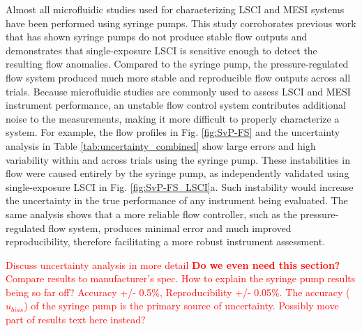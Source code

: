 \documentclass[12pt]{spieman}
\begin{document}
\begin{spacing}{2}
Almost all microfluidic studies used for characterizing LSCI and MESI systems have been performed using syringe pumps. This study corroborates previous work \cite{Korczyk:2010eu,Li:2014ca,Zhou:2011ey} that has shown syringe pumps do not produce stable flow outputs and demonstrates that single-exposure LSCI is sensitive enough to detect the resulting flow anomalies. Compared to the syringe pump, the pressure-regulated flow system produced much more stable and reproducible flow outputs across all trials. Because microfluidic studies are commonly used to assess LSCI and MESI instrument performance, an unstable flow control system contributes additional noise to the measurements, making it more difficult to properly characterize a system. For example, the flow profiles in Fig. \ref{fig:SvP-FS} and the uncertainty analysis in Table \ref{tab:uncertainty_combined} show large errors and high variability within and across trials using the syringe pump. These instabilities in flow were caused entirely by the syringe pump, as independently validated using single-exposure LSCI in Fig. \ref{fig:SvP-FS_LSCI}a. Such instability would increase the uncertainty in the true performance of any instrument being evaluated. The same analysis shows that a more reliable flow controller, such as the pressure-regulated flow system, produces minimal error and much improved reproducibility, therefore facilitating a more robust instrument assessment. 

\textcolor{red}{Discuss uncertainty analysis in more detail \textbf{Do we even need this section?} Compare results to manufacturer's spec. How to explain the syringe pump results being so far off? Accuracy +/- 0.5\%, Reproducibility +/- 0.05\%. The accuracy ($u_{bias}$) of the syringe pump is the primary source of uncertainty. Possibly move part of results text here instead?}


\end{spacing}
\end{document}
